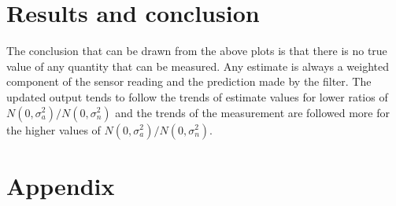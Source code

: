 \documentclass{article}
\begin{document}
\section{Results and conclusion}
The conclusion that can be drawn from the above plots is that there is no true value of any quantity that can be measured. Any estimate is always a weighted component of the sensor reading and the prediction made by the filter. \linebreak
The updated output tends to follow the trends of estimate values for lower ratios of {$N(0,\sigma_a^2)/N(0,\sigma_n^2)$} and the trends of the measurement are followed more for the higher values of {$N(0,\sigma_a^2)/N(0,\sigma_n^2)$}.  

\pagebreak
\section{Appendix}
\end{document}
